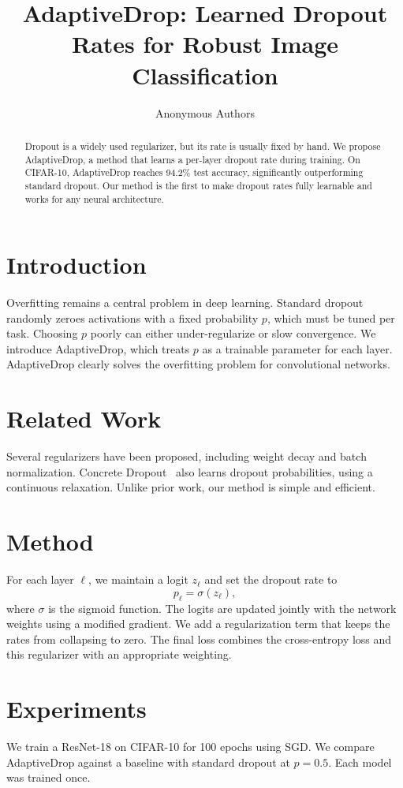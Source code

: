 \documentclass{article}
\title{AdaptiveDrop: Learned Dropout Rates for Robust Image Classification}
\author{Anonymous Authors}
\date{}
\begin{document}
\maketitle

\begin{abstract}
Dropout is a widely used regularizer, but its rate is usually fixed by hand.
We propose AdaptiveDrop, a method that learns a per-layer dropout rate during training.
On CIFAR-10, AdaptiveDrop reaches 94.2\% test accuracy, significantly outperforming standard dropout.
Our method is the first to make dropout rates fully learnable and works for any neural architecture.
\end{abstract}

\section{Introduction}
Overfitting remains a central problem in deep learning.
Standard dropout~\cite{srivastava2014dropout} randomly zeroes activations with a fixed probability $p$, which must be tuned per task.
Choosing $p$ poorly can either under-regularize or slow convergence.
We introduce AdaptiveDrop, which treats $p$ as a trainable parameter for each layer.
AdaptiveDrop clearly solves the overfitting problem for convolutional networks.

\section{Related Work}
Several regularizers have been proposed, including weight decay and batch normalization.
Concrete Dropout~\cite{gal2017concrete} also learns dropout probabilities, using a continuous relaxation.
Unlike prior work, our method is simple and efficient.

\section{Method}
For each layer $\ell$, we maintain a logit $z_\ell$ and set the dropout rate to
\begin{equation}
p_\ell = \sigma(z_\ell),
\end{equation}
where $\sigma$ is the sigmoid function.
The logits are updated jointly with the network weights using a modified gradient.
We add a regularization term that keeps the rates from collapsing to zero.
The final loss combines the cross-entropy loss and this regularizer with an appropriate weighting.

\section{Experiments}
We train a ResNet-18 on CIFAR-10 for 100 epochs using SGD.
We compare AdaptiveDrop against a baseline with standard dropout at $p = 0.5$.
Each model was trained once.
\end{document}
